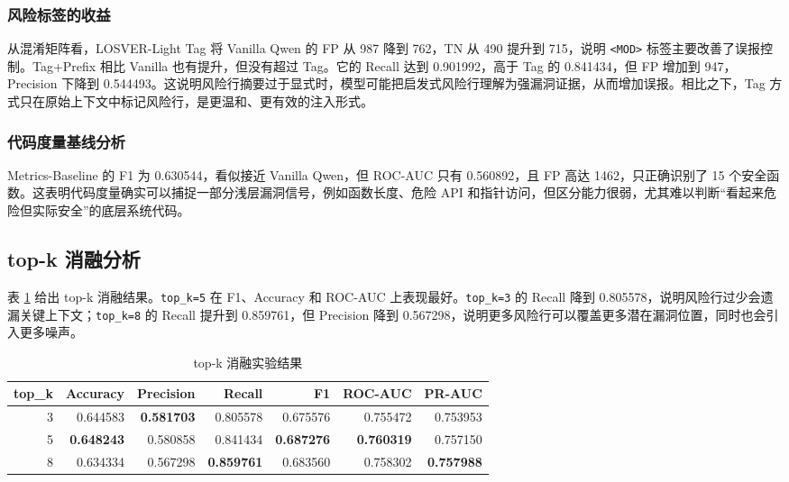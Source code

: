 \documentclass[10pt]{article}
\newcommand{\methodname}{LOSVER-Light}
\newcommand{\modtag}{\texttt{\textless MOD\textgreater}}
\begin{document}
\subsubsection{风险标签的收益}

从混淆矩阵看，\methodname{} Tag 将 Vanilla Qwen 的 FP 从 987 降到 762，TN 从 490 提升到 715，说明 \modtag{} 标签主要改善了误报控制。Tag+Prefix 相比 Vanilla 也有提升，但没有超过 Tag。它的 Recall 达到 0.901992，高于 Tag 的 0.841434，但 FP 增加到 947，Precision 下降到 0.544493。这说明风险行摘要过于显式时，模型可能把启发式风险行理解为强漏洞证据，从而增加误报。相比之下，Tag 方式只在原始上下文中标记风险行，是更温和、更有效的注入形式。

\subsubsection{代码度量基线分析}

Metrics-Baseline 的 F1 为 0.630544，看似接近 Vanilla Qwen，但 ROC-AUC 只有 0.560892，且 FP 高达 1462，只正确识别了 15 个安全函数。这表明代码度量确实可以捕捉一部分浅层漏洞信号，例如函数长度、危险 API 和指针访问，但区分能力很弱，尤其难以判断“看起来危险但实际安全”的底层系统代码。

\subsection{top-k 消融分析}

表 \ref{tab:topk-ablation} 给出 top-k 消融结果。\texttt{top\_k=5} 在 F1、Accuracy 和 ROC-AUC 上表现最好。\texttt{top\_k=3} 的 Recall 降到 0.805578，说明风险行过少会遗漏关键上下文；\texttt{top\_k=8} 的 Recall 提升到 0.859761，但 Precision 降到 0.567298，说明更多风险行可以覆盖更多潜在漏洞位置，同时也会引入更多噪声。

\begin{table}[H]
\centering
\caption{top-k 消融实验结果}
\label{tab:topk-ablation}
\begin{tabular}{rrrrrrr}
\toprule
top\_k & Accuracy & Precision & Recall & F1 & ROC-AUC & PR-AUC \\
\midrule
3 & 0.644583 & \textbf{0.581703} & 0.805578 & 0.675576 & 0.755472 & 0.753953 \\
5 & \textbf{0.648243} & 0.580858 & 0.841434 & \textbf{0.687276} & \textbf{0.760319} & 0.757150 \\
8 & 0.634334 & 0.567298 & \textbf{0.859761} & 0.683560 & 0.758302 & \textbf{0.757988} \\
\bottomrule
\end{tabular}
\end{table}
\end{document}

